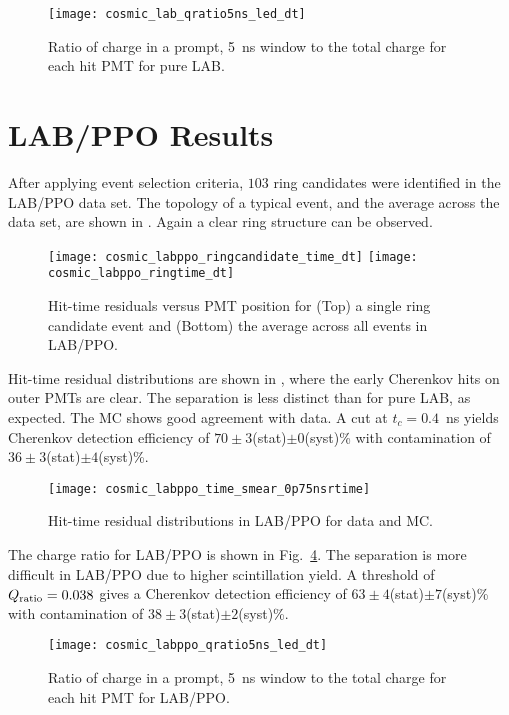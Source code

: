 \begin{figure}
	\centering
	\texttt{[image: cosmic\_lab\_qratio5ns\_led\_dt]}
	\caption{Ratio of charge in a prompt, 5~ns window to the total charge for each hit PMT  for pure LAB.}
	\label{f:labQ}
\end{figure}

\section{LAB/PPO Results}
\label{sec:labppo}

After applying event selection criteria, $103$ ring candidates were identified in the LAB/PPO data set. 
The topology of a typical event, and the average across the data set, are shown in .  Again a clear ring structure can be observed. 
\begin{figure}[!t]
	\centering
	\texttt{[image: cosmic\_labppo\_ringcandidate\_time\_dt]}
	\texttt{[image: cosmic\_labppo\_ringtime\_dt]}	
	\caption{Hit-time residuals versus PMT position for (Top) a single ring candidate event and (Bottom) the average across all events in LAB/PPO.}
	\label{fig:labppo_ring}
\end{figure}
Hit-time residual distributions are shown in , where the early Cherenkov hits on outer PMTs are clear. The separation is less distinct than for pure LAB, as expected. The MC shows good agreement with data.  
A  cut at $ t_c = 0.4$~ns yields Cherenkov detection efficiency of  $70 \pm 3 $(stat)$\pm0$(syst)\% with contamination of $36 \pm 3 $(stat)$\pm4$(syst)\%. 



\begin{figure}
	\centering
	\texttt{[image: cosmic\_labppo\_time\_smear\_0p75nsrtime]}
	\caption{Hit-time residual distributions in LAB/PPO for data and MC.}
	\label{fig:labppo}
\end{figure}

The charge ratio for LAB/PPO is shown in Fig.~\ref{f:labppoQ}.   The separation is more difficult in LAB/PPO due to higher scintillation yield.  A threshold of $Q_{\rm ratio}=0.038$ gives a Cherenkov detection efficiency of $63\pm4$(stat)$\pm7$(syst)\% with contamination of $38\pm3$(stat)$\pm2$(syst)\%.

\begin{figure}
	\centering
	\texttt{[image: cosmic\_labppo\_qratio5ns\_led\_dt]}
	\caption{Ratio of charge in a prompt, 5~ns window to the total charge for each hit PMT for LAB/PPO.}
	\label{f:labppoQ}
\end{figure}

